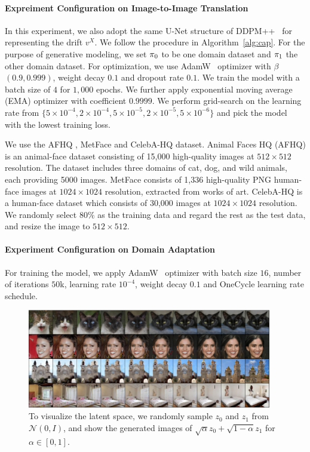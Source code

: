 \paragraph{Expreiment Configuration on Image-to-Image Translation}
In this experiment, we also adopt the same U-Net structure of DDPM++~\cite{song2020score} for representing the drift $v^X$. 
We follow the procedure in Algorithm~\ref{alg:cap}. 
For the purpose of generative modeling, we set ${\pi}_0$ to be one domain dataset and ${\pi}_1$ the other domain dataset. 
For optimization, we use AdamW~\citep{loshchilov2017decoupled} optimizer with $\beta$ $(0.9, 0.999)$, weight decay $0.1$ and dropout rate $0.1$.
We train the model with a batch size of $4$ for $1,000$ epochs. 
We further apply exponential moving average (EMA) optimizer with coefficient $0.9999$.
We perform grid-search on the learning rate from $\{5\times 10^{-4}, 2\times 10^{-4}, 5\times 10^{-5}, 2\times 10^{-5}, 5\times 10^{-6}\}$ and pick the model with the lowest training loss.

We use the AFHQ \citep{choi2020stargan}, MetFace \citep{karras2020training} and CelebA-HQ \citep{karras2018progressive} dataset. 
Animal Faces HQ (AFHQ) is an animal-face dataset consisting of 15,000 high-quality images at $512 \times 512$ resolution. The dataset includes three domains of cat, dog, and wild animals, each providing 5000 images. 
MetFace consists of 1,336 high-quality PNG human-face images at $1024 \times 1024$ resolution, extracted from works of art.
CelebA-HQ is a human-face dataset which consists of 30,000 images at $1024 \times 1024$ resolution.
We randomly select $80\%$ as the training data and regard the rest as the test data, and resize the image to $512 \times 512$.

\paragraph{Experiment Configuration on Domain Adaptation}
For training the model, we apply AdamW~\citep{loshchilov2017decoupled} optimizer with batch size $16$, number of iterations $50$k, learning rate $10^{-4}$, weight decay $0.1$ and OneCycle \citep{smith2019onecycle} learning rate schedule.

\begin{figure}
    \centering
    \includegraphics[width=0.95\textwidth]{arxiv_figures/latent_space_interp.jpeg}
    \caption{
    To visualize the latent space, we randomly sample $z_0$ and $z_1$ from $\mathcal{N}(0, I)$, and show the generated images of $\sqrt{\alpha} z_0 + \sqrt{1- \alpha} z_1$ for $\alpha \in [0,1]$.
    }
    \label{fig:interp}
\end{figure}

